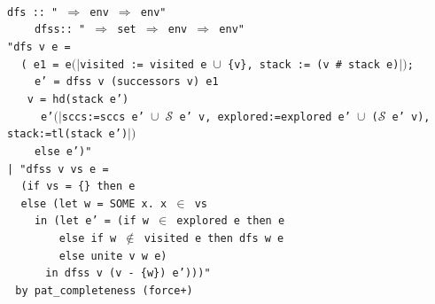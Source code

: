 \documentclass[a4 paper, 12pt]{article}
\newcommand{\where}{{\color{isa_green}{where}}}
\renewcommand{\and}{{\color{isa_green}{and}}}
\newcommand{\generic}[1]{{\color{isa_purple}{\textquotesingle#1}}}
\newcommand{\isa}[1]{\small\texttt{\\\noindent#1}}
\newcommand{\env}[1]{$(\!|$#1$|\!)$}
\theoremstyle{definition}
\begin{document}
\isa{
    {\color{isa_blue}{function}} dfs :: "\generic{v} $\Rightarrow$ \generic{v} env $\Rightarrow$ \generic{v} env" \and{}\\
    $~~~~~~~~~~$dfss:: "\generic{v} $\Rightarrow$ \generic{v} set $\Rightarrow$ \generic{v} env $\Rightarrow$ \generic{v} env" \where\\
    "{\color{isa_dark_blue}dfs} {\color{isa_dark_green}v e} =\\
    $~~~~~$({\color{isa_blue}{let}} {\color{isa_dark_green}e1} = {\color{isa_dark_green}e}\env{visited := visited e $\cup$ \{{\color{isa_dark_green}v}\}, stack := ({\color{isa_dark_green}v} \# stack {\color{isa_dark_green}e})};\\
    $~~~~~~~~~~${\color{isa_dark_green}e'} = {\color{isa_dark_blue}dfss} {\color{isa_dark_green}v} (successors {\color{isa_dark_green}v}) {\color{isa_dark_green}e1}\\
    $~~~~~${\color{isa_blue}{in if}} {\color{isa_dark_green}v} = hd(stack {\color{isa_dark_green}e'})\\
    $~~~~~~~~~~${\color{isa_blue}{then}} {\color{isa_dark_green}e'}\env{sccs:=sccs {\color{isa_dark_green}e'} $\cup$ {$\mathcal{S}$ {\color{isa_dark_green}e' v}}, explored:=explored {\color{isa_dark_green}e'} $\cup$ ($\mathcal{S}$ {\color{isa_dark_green}e' v}), stack:=tl(stack {\color{isa_dark_green}e'})}\\
    $~~~~~~~~~~${\color{isa_blue}else} {\color{isa_dark_green}e'})"\\
    | "{\color{isa_dark_blue}dfss} {\color{isa_dark_green}v vs e} =\\
    $~~~~~$({\color{isa_blue}if} {\color{isa_dark_green}vs} = \{\} {\color{isa_blue}then} {\color{isa_dark_green}e}\\
    $~~~~~${\color{isa_blue}else} ({\color{isa_blue}let} {\color{isa_dark_green}w} = SOME {\color{isa_dark_green}x}. {\color{isa_dark_green}x} $\in$ {\color{isa_dark_green}vs}\\
    $~~~~~~~~~~${\color{isa_blue}in} ({\color{isa_blue}let} {\color{isa_dark_green}e'} = ({\color{isa_blue}if} {\color{isa_dark_green}w} $\in$ explored {\color{isa_dark_green}e} {\color{isa_blue}then} {\color{isa_dark_green}e}\\
    $~~~~~~~~~~~~~~~~~~~${\color{isa_blue}else if} {\color{isa_dark_green}w} $\notin$ visited {\color{isa_dark_green}e} {\color{isa_blue}then} {\color{isa_dark_blue}dfs} {\color{isa_dark_green}w e}\\
    $~~~~~~~~~~~~~~~~~~~${\color{isa_blue}else} unite {\color{isa_dark_green}v w e})\\
    $~~~~~~~~~~~~~~${\color{isa_blue}in} {\color{isa_dark_blue}dfss} {\color{isa_dark_green}v} ({\color{isa_dark_green}v} - \{{\color{isa_dark_green}w}\}) {\color{isa_dark_green}e'})))"\\
    $~~~${\color{isa_blue}by} pat\_completeness (force+)\\
}
\end{document}
